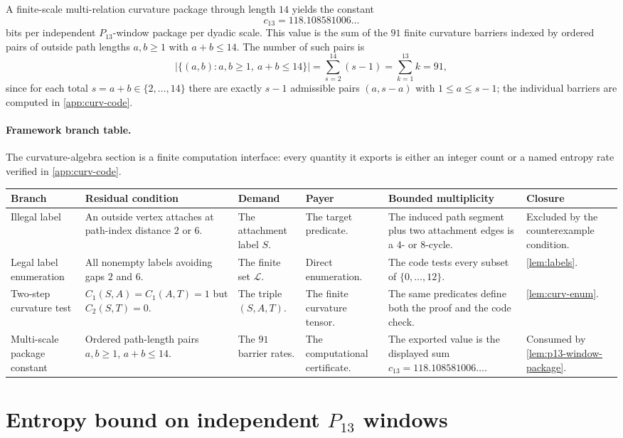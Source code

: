 \documentclass[11pt]{article}
\newcommand{\labels}{\mathcal L}
\newcommand{\FrameworkBranchTableHeader}{%
\toprule
\textbf{Branch} & \textbf{Residual condition} & \textbf{Demand} & \textbf{Payer} & \textbf{Bounded multiplicity} & \textbf{Closure}\\
\midrule
}
\begin{document}
A finite-scale multi-relation curvature package through length $14$ yields the constant
\[
\boxed{c_{13}=118.108581006\ldots}
\]
bits per independent $P_{13}$-window package per dyadic scale.  This value is the sum of the $91$ finite curvature barriers indexed by ordered pairs of outside path lengths $a,b\ge1$ with $a+b\le14$.  The number of such pairs is
\[
\bigl|\{(a,b):a,b\ge1,\ a+b\le14\}\bigr|=\sum_{s=2}^{14}(s-1)=\sum_{k=1}^{13}k=91,
\]
since for each total $s=a+b\in\{2,\ldots,14\}$ there are exactly $s-1$ admissible pairs $(a,s-a)$ with $1\le a\le s-1$; the individual barriers are computed in \cref{app:curv-code}.

\paragraph{Framework branch table.}
The curvature-algebra section is a finite computation interface: every
quantity it exports is either an integer count or a named entropy rate
verified in \cref{app:curv-code}.
\begin{longtable}{L{0.13\textwidth} L{0.19\textwidth} L{0.14\textwidth} L{0.14\textwidth} L{0.17\textwidth} L{0.17\textwidth}}
\FrameworkBranchTableHeader
Illegal label
&
An outside vertex attaches at path-index distance \(2\) or \(6\).
&
The attachment label \(S\).
&
The target predicate.
&
The induced path segment plus two attachment edges is a \(4\)- or \(8\)-cycle.
&
Excluded by the counterexample condition.
\\
\addlinespace
Legal label enumeration
&
All nonempty labels avoiding gaps \(2\) and \(6\).
&
The finite set \(\labels\).
&
Direct enumeration.
&
The code tests every subset of \(\{0,\ldots,12\}\).
&
\cref{lem:labels}.
\\
\addlinespace
Two-step curvature test
&
\(C_1(S,A)=C_1(A,T)=1\) but \(C_2(S,T)=0\).
&
The triple \((S,A,T)\).
&
The finite curvature tensor.
&
The same predicates define both the proof and the code check.
&
\cref{lem:curv-enum}.
\\
\addlinespace
Multi-scale package constant
&
Ordered path-length pairs \(a,b\ge1\), \(a+b\le14\).
&
The \(91\) barrier rates.
&
The computational certificate.
&
The exported value is the displayed sum \(c_{13}=118.108581006\ldots\).
&
Consumed by \cref{lem:p13-window-package}.
\\
\bottomrule
\end{longtable}

\section{Entropy bound on independent \texorpdfstring{$P_{13}$}{P13} windows}\label{sec:entropy-bound}
\end{document}
